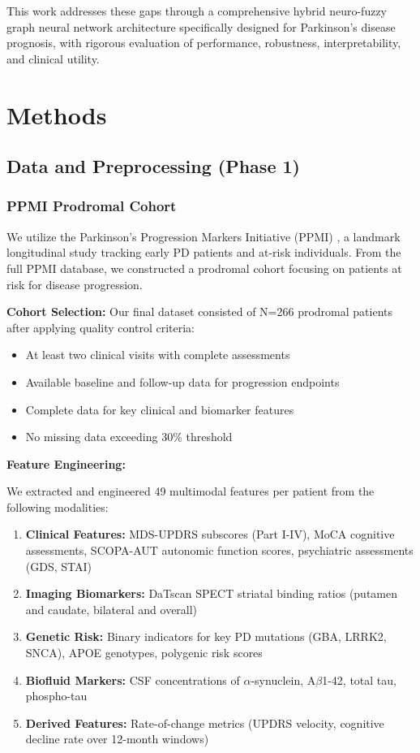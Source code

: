 \documentclass[conference]{IEEEtran}
\begin{document}
This work addresses these gaps through a comprehensive hybrid neuro-fuzzy graph neural network architecture specifically designed for Parkinson's disease prognosis, with rigorous evaluation of performance, robustness, interpretability, and clinical utility.
\section{Methods}
\label{sec:methods}

\subsection{Data and Preprocessing (Phase 1)}

\subsubsection{PPMI Prodromal Cohort}

We utilize the Parkinson's Progression Markers Initiative (PPMI) \cite{marek2011ppmi}, a landmark longitudinal study tracking early PD patients and at-risk individuals. From the full PPMI database, we constructed a prodromal cohort focusing on patients at risk for disease progression.

\textbf{Cohort Selection:} Our final dataset consisted of N=266 prodromal patients after applying quality control criteria:
\begin{itemize}
\item At least two clinical visits with complete assessments
\item Available baseline and follow-up data for progression endpoints
\item Complete data for key clinical and biomarker features
\item No missing data exceeding 30\% threshold
\end{itemize}

\textbf{Feature Engineering:}

We extracted and engineered 49 multimodal features per patient from the following modalities:

\begin{enumerate}
\item \textbf{Clinical Features:} MDS-UPDRS subscores (Part I-IV), MoCA cognitive assessments, SCOPA-AUT autonomic function scores, psychiatric assessments (GDS, STAI)
\item \textbf{Imaging Biomarkers:} DaTscan SPECT striatal binding ratios (putamen and caudate, bilateral and overall)
\item \textbf{Genetic Risk:} Binary indicators for key PD mutations (GBA, LRRK2, SNCA), APOE genotypes, polygenic risk scores
\item \textbf{Biofluid Markers:} CSF concentrations of $\alpha$-synuclein, A$\beta$1-42, total tau, phospho-tau
\item \textbf{Derived Features:} Rate-of-change metrics (UPDRS velocity, cognitive decline rate over 12-month windows)
\end{enumerate}
\end{document}

